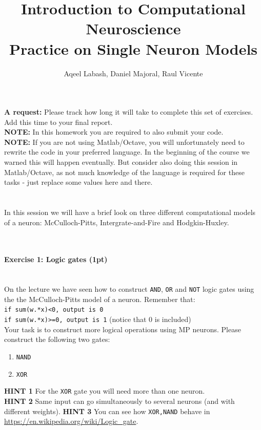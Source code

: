 \documentclass[a4paper,11pt]{article}
\author{\large{Aqeel Labash, Daniel Majoral, Raul Vicente}}
\title{\huge{Introduction to Computational Neuroscience}\\\LARGE{Practice on Single Neuron Models}}
\newenvironment{exercise}[3]{\paragraph{Exercise #1: #2 (#3pt)}\ \\}{
\medskip}
\begin{document}
\maketitle

\textbf{A request:} Please track how long it will take to complete this set of exercises. Add this time to your final report.
\ \\
\textbf{NOTE:} In this homework you are required to also submit your code.\\
\textbf{NOTE:} If you are not using Matlab/Octave, you will unfortunately need to rewrite the code in your preferred language. In the beginning of the course we warned this will happen eventually. But consider also doing this session in Matlab/Octave, as not much knowledge of the language is required for these tasks - just replace some values here and there.\\
\ \\
\ \\
%
%
In this session we will have a brief look on three different computational models of a neuron: McCulloch-Pitts, Intergrate-and-Fire and Hodgkin-Huxley.\

\ \\

%
%
\begin{exercise}{1}{Logic gates}{1}
On the lecture we have seen how to construct \texttt{AND}, \texttt{OR} and \texttt{NOT} logic gates using the the McCulloch-Pitts model of a neuron. Remember that:\\
 \texttt{if sum(w.*x)<0, output is 0}\\
 \texttt{if sum(w.*x)>=0, output is 1} (notice that 0 is included)\\
 Your task is to construct more logical operations using MP neurons. Please construct the following two gates:
\begin{enumerate}
\itemsep 0em
	\item \texttt{NAND}
	\item \texttt{XOR}
\end{enumerate}
\textbf{HINT 1} For the \texttt{XOR} gate you will need more than one neuron.\\
\textbf{HINT 2} Same input can go simultaneously to several neurons (and with different weights).
\textbf{HINT 3} You can see how \texttt{XOR,NAND} behave in  \href{https://en.wikipedia.org/wiki/Logic\_gate}{https://en.wikipedia.org/wiki/Logic\_gate}.
\end{exercise}
\end{document}
